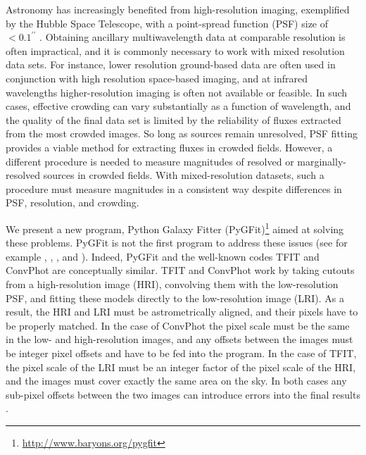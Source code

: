 \documentclass[preprint]{aastex}
\newcommand{\pygfit}{PyGFit}
\newcommand{\tfit}{TFIT}
\newcommand{\convphot}{ConvPhot}
\begin{document}
Astronomy has increasingly benefited from high-resolution imaging, exemplified by the Hubble Space Telescope, with a point-spread function (PSF) size of $<0.1^{\prime\prime}$ \citep{wfc3handbook}.  Obtaining ancillary multiwavelength data at comparable resolution is often impractical, and it is commonly necessary to work with mixed resolution data sets.  For instance, lower resolution ground-based data are often used in conjunction with high resolution space-based imaging, and at infrared wavelengths higher-resolution imaging is often not available or feasible.  In such cases, effective crowding can vary substantially as a function of wavelength, and the quality of the final data set is limited by the reliability of fluxes extracted from the most crowded images.  So long as sources remain unresolved, PSF fitting provides a viable method for extracting fluxes in crowded fields.  However, a different procedure is needed to measure magnitudes of resolved or marginally-resolved sources in crowded fields.  With mixed-resolution datasets, such a procedure must measure magnitudes in a consistent way despite differences in PSF, resolution, and crowding.

We present a new program, Python Galaxy Fitter (\pygfit{}){\footnote{\url{http://www.baryons.org/pygfit}}} aimed at solving these problems.  \pygfit{} is not the first program to address these issues (see for example \citealt{soto99}, \citealt{labbe05}, \citealt{tfit}, and \citealt{desantis07}).  Indeed, \pygfit{} and the well-known codes \tfit{} \citep{tfit} and \convphot{} \citep{desantis07} are conceptually similar.  \tfit{} and \convphot{} work by taking cutouts from a high-resolution image (HRI), convolving them with the low-resolution PSF, and fitting these models directly to the low-resolution image (LRI).  As a result, the HRI and LRI must be astrometrically aligned, and their pixels have to be properly matched.  In the case of \convphot{} the pixel scale must be the same in the low- and high-resolution images, and any offsets between the images must be integer pixel offsets and have to be fed into the program.  In the case of \tfit{}, the pixel scale of the LRI must be an integer factor of the pixel scale of the HRI, and the images must cover exactly the same area on the sky.  In both cases any sub-pixel offsets between the two images can introduce errors into the final results \citep{tfit}.
\end{document}
